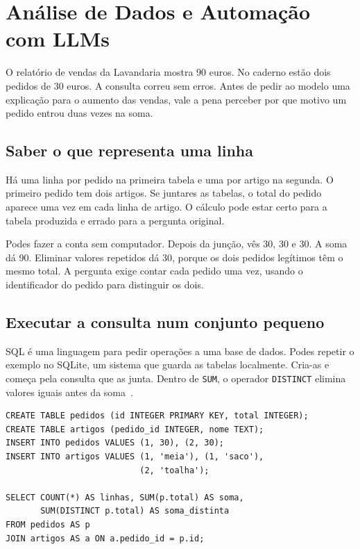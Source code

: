 \chapter{Análise de Dados e Automação com LLMs}
\label{ch:analise-dados}

\ficcao O relatório de vendas da Lavandaria mostra 90 euros. No caderno estão dois pedidos de 30 euros. A consulta correu sem erros. Antes de pedir ao modelo uma explicação para o aumento das vendas, vale a pena perceber por que motivo um pedido entrou duas vezes na soma.

\section{Saber o que representa uma linha}

Há uma linha por pedido na primeira tabela e uma por artigo na segunda. O primeiro pedido tem dois artigos. Se juntares as tabelas, o total do pedido aparece uma vez em cada linha de artigo. O cálculo pode estar certo para a tabela produzida e errado para a pergunta original.

Podes fazer a conta sem computador. Depois da junção, vês 30, 30 e 30. A soma dá 90. Eliminar valores repetidos dá 30, porque os dois pedidos legítimos têm o mesmo total. A pergunta exige contar cada pedido uma vez, usando o identificador do pedido para distinguir os dois.

\section{Executar a consulta num conjunto pequeno}

SQL é uma linguagem para pedir operações a uma base de dados. Podes repetir o exemplo no SQLite, um sistema que guarda as tabelas localmente. Cria-as e começa pela consulta que as junta. Dentro de \texttt{SUM}, o operador \texttt{DISTINCT} elimina valores iguais antes da soma~\citep{sqliteagregados2026}.

\begin{lstlisting}
CREATE TABLE pedidos (id INTEGER PRIMARY KEY, total INTEGER);
CREATE TABLE artigos (pedido_id INTEGER, nome TEXT);
INSERT INTO pedidos VALUES (1, 30), (2, 30);
INSERT INTO artigos VALUES (1, 'meia'), (1, 'saco'),
                           (2, 'toalha');

SELECT COUNT(*) AS linhas, SUM(p.total) AS soma,
       SUM(DISTINCT p.total) AS soma_distinta
FROM pedidos AS p
JOIN artigos AS a ON a.pedido_id = p.id;
\end{lstlisting}

